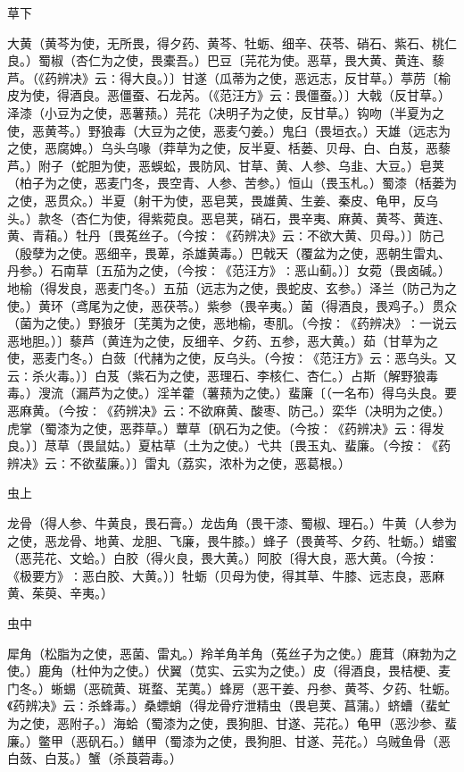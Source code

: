 \documentclass[a4paper,12pt,UTF8,twoside]{ctexbook}
\begin{document}
草下

大黄（黄芩为使，无所畏，得夕药、黄芩、牡蛎、细辛、茯苓、硝石、紫石、桃仁良。）蜀椒（杏仁为之使，畏橐吾。）巴豆〔芫花为使。恶草，畏大黄、黄连、藜芦。（《药辨决》云∶得大良。）〕甘遂（瓜蒂为之使，恶远志，反甘草。）葶苈〔榆皮为使，得酒良。恶僵蚕、石龙芮。（《范汪方》云∶畏僵蚕。）〕大戟（反甘草。）泽漆（小豆为之使，恶薯蓣。）芫花（决明子为之使，反甘草。）钩吻（半夏为之使，恶黄芩。）野狼毒（大豆为之使，恶麦勺姜。）鬼臼（畏垣衣。）天雄（远志为之使，恶腐婢。）乌头乌喙（莽草为之使，反半夏、栝蒌、贝母、白、白芨，恶藜芦。）附子（蛇胆为使，恶蜈蚣，畏防风、甘草、黄、人参、乌韭、大豆。）皂荚（柏子为之使，恶麦门冬，畏空青、人参、苦参。）恒山（畏玉札。）蜀漆（栝蒌为之使，恶贯众。）半夏（射干为使，恶皂荚，畏雄黄、生姜、秦皮、龟甲，反乌头。）款冬（杏仁为使，得紫菀良。恶皂荚，硝石，畏辛夷、麻黄、黄芩、黄连、黄、青葙。）牡丹〔畏菟丝子。（今按∶《药辨决》云∶不欲大黄、贝母。）〕防己（殷孽为之使。恶细辛，畏萆，杀雄黄毒。）巴戟天（覆盆为之使，恶朝生雷丸、丹参。）石南草〔五茄为之使，（今按∶《范汪方》∶恶山蓟。）〕女菀（畏卤碱。）地榆（得发良，恶麦门冬。）五茄（远志为之使，畏蛇皮、玄参。）泽兰（防己为之使。）黄环（鸢尾为之使，恶茯苓。）紫参（畏辛夷。）菌（得酒良，畏鸡子。）贯众（菌为之使。）野狼牙〔芜荑为之使，恶地榆，枣肌。（今按∶《药辨决》∶一说云恶地胆。）〕藜芦（黄连为之使，反细辛、夕药、五参，恶大黄。）茹（甘草为之使，恶麦门冬。）白蔹〔代赭为之使，反乌头。（今按∶《范汪方》云∶恶乌头。又云∶杀火毒。）〕白芨（紫石为之使，恶理石、李核仁、杏仁。）占斯（解野狼毒毒。）溲流（漏芦为之使。）淫羊藿（薯蓣为之使。）蜚廉〔（一名布）得乌头良。要恶麻黄。（今按∶《药辨决》云∶不欲麻黄、酸枣、防己。）栾华（决明为之使。）虎掌（蜀漆为之使，恶莽草。）蕈草〔矾石为之使。（今按∶《药辨决》云∶得发良。）〕荩草（畏鼠姑。）夏枯草（土为之使。）弋共〔畏玉丸、蜚廉。（今按∶《药辨决》云∶不欲蜚廉。）〕雷丸（荔实，浓朴为之使，恶葛根。）

虫上

龙骨（得人参、牛黄良，畏石膏。）龙齿角（畏干漆、蜀椒、理石。）牛黄（人参为之使，恶龙骨、地黄、龙胆、飞廉，畏牛膝。）蜂子（畏黄芩、夕药、牡蛎。）蜡蜜（恶芫花、文蛤。）白胶（得火良，畏大黄。）阿胶〔得大良，恶大黄。（今按∶《极要方》∶恶白胶、大黄。）〕牡蛎（贝母为使，得其草、牛膝、远志良，恶麻黄、茱萸、辛夷。）

虫中

犀角（松脂为之使，恶菌、雷丸。）羚羊角羊角（菟丝子为之使。）鹿茸（麻勃为之使。）鹿角（杜仲为之使。）伏翼（苋实、云实为之使。）皮（得酒良，畏桔梗、麦门冬。）蜥蜴（恶硫黄、斑蝥、芜荑。）蜂房（恶干姜、丹参、黄芩、夕药、牡蛎。《药辨决》云∶杀蜂毒。）桑螵蛸（得龙骨疗泄精虫（畏皂荚、菖蒲。）蛴螬（蜚虻为之使，恶附子。）海蛤（蜀漆为之使，畏狗胆、甘遂、芫花。）龟甲（恶沙参、蜚廉。）鳖甲（恶矾石。）鳝甲（蜀漆为之使，畏狗胆、甘遂、芫花。）乌贼鱼骨（恶白蔹、白芨。）蟹（杀莨菪毒。）
\end{document}

